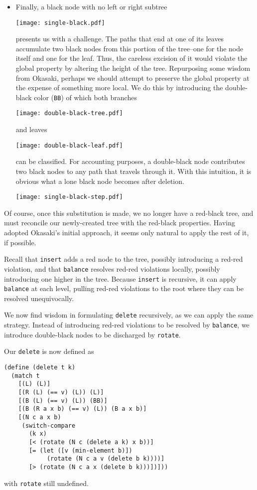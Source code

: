 \documentclass[preprint]{sigplanconf}
\begin{document}
\begin{itemize}
\item Finally, a black node with no left or right subtree
\begin{center}
\texttt{[image: single-black.pdf]}
\end{center}
presents us with a challenge. The paths that end at one of its leaves accumulate two black nodes from this portion of the tree--one for the node itself and one for the leaf. Thus, the careless excision of it would violate the global property by altering the height of the tree. Repurposing some wisdom from Okasaki, perhaps we should attempt to preserve the global property at the expense of something more local. We do this by introducing the double-black color (\texttt{BB}) of which both branches
\begin{center}
\texttt{[image: double-black-tree.pdf]}
\end{center}
and leaves
\begin{center}
\texttt{[image: double-black-leaf.pdf]}
\end{center}
can be classified. For accounting purposes, a double-black node contributes two black nodes to any path that travels through it. With this intuition, it is obvious what a lone black node becomes after deletion. 
\begin{center}
\texttt{[image: single-black-step.pdf]}
\end{center}

\end{itemize}

Of course, once this substitution is made, we no longer have a red-black tree, and must reconcile our newly-created tree with the red-black properties. Having adopted Okasaki's initial approach, it seems only natural to apply the rest of it, if possible.

Recall that \texttt{insert} adds a red node to the tree, possibly introducing a red-red violation, and that \texttt{balance} resolves red-red violations locally, possibly introducing one higher in the tree. Because \texttt{insert} is recursive, it can apply \texttt{balance} at each level, pulling red-red violations to the root where they can be resolved unequivocally.

We now find wisdom in formulating \texttt{delete} recursively, as we can apply the same strategy. Instead of introducing red-red violations to be resolved by \texttt{balance}, we introduce double-black nodes to be discharged by \texttt{rotate}.

Our \texttt{delete} is now defined as
\begin{verbatim}
(define (delete t k)
  (match t
    [(L) (L)]
    [(R (L) (== v) (L)) (L)]
    [(B (L) (== v) (L)) (BB)]
    [(B (R a x b) (== v) (L)) (B a x b)]
    [(N c a x b)
     (switch-compare
       (k x)
       [< (rotate (N c (delete a k) x b))]
       [= (let ([v (min-element b)])
            (rotate (N c a v (delete b k))))]
       [> (rotate (N c a x (delete b k)))])]))
\end{verbatim}
with \texttt{rotate} still undefined.
\end{document}
